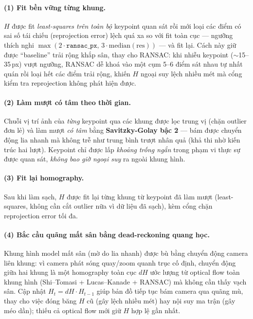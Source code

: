\documentclass[12pt,a4paper]{article}
\begin{document}
\paragraph{(1) Fit bền vững từng khung.} $H$ được fit \emph{least-squares trên toàn bộ}
keypoint quan sát rồi mới loại các điểm có sai số tái chiếu (reprojection error) lệch quá
xa so với fit toàn cục --- ngưỡng thích nghi $\max(2\cdot\texttt{ransac\_px},\,3\cdot
\mathrm{median}(\text{res}))$ --- và fit lại. Cách này giữ được ``baseline'' trải rộng
khắp sân, thay cho RANSAC: khi nhiễu keypoint ($\sim$15--35\,px) vượt ngưỡng, RANSAC dễ
khoá vào một cụm 5--6 điểm sát nhau tự nhất quán rồi loại hết các điểm trải rộng, khiến
$H$ ngoại suy lệch nhiều mét mà cổng kiểm tra reprojection không phát hiện được.

\paragraph{(2) Làm mượt có tâm theo thời gian.} Chuỗi vị trí ảnh của \emph{từng} keypoint
qua các khung được lọc trung vị (chặn outlier đơn lẻ) và làm mượt \emph{có tâm} bằng
\textbf{Savitzky-Golay bậc 2} --- bám được chuyển động lia nhanh mà không trễ như trung
bình trượt nhân quả (khả thi nhờ kiến trúc hai lượt). Keypoint chỉ được lấp \emph{khoảng
trống ngắn} trong phạm vi thực sự được quan sát, \emph{không bao giờ ngoại suy} ra ngoài
khung hình.

\paragraph{(3) Fit lại homography.} Sau khi làm sạch, $H$ được fit lại từng khung từ
keypoint đã làm mượt (least-squares, không cần cắt outlier nữa vì dữ liệu đã sạch), kèm
cổng chặn reprojection error tối đa.

\paragraph{(4) Bắc cầu quãng mất sân bằng dead-reckoning quang học.} Khung hình model mất
sân (mờ do lia nhanh) được bù bằng chuyển động camera liên khung: vì camera phát sóng
quay/zoom quanh trục cố định, chuyển động giữa hai khung là một homography toàn cục $dH$
ước lượng từ optical flow toàn khung hình (Shi--Tomasi + Lucas--Kanade + RANSAC) mà không
cần thấy vạch sân. Cập nhật $H_t = dH\cdot H_{t-1}$ giúp bản đồ tiếp tục bám camera qua
quãng mù, thay cho việc đóng băng $H$ cũ (gây lệch nhiều mét) hay nội suy ma trận (gây
méo dần); thiếu cả optical flow mới giữ $H$ hợp lệ gần nhất.
\end{document}
